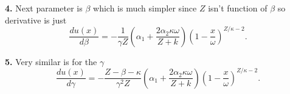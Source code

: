 \documentclass{article}
\begin{document}
\begin{appendices}

\bigskip

{\bf 4.} Next parameter is $\beta$ which is much simpler since $Z$ isn't function of $\beta$ so derivative is just
\begin{equation}\label{eq:db}
  \frac{d u(x)}{d\beta} =-\frac{1}{\gamma Z}\left(\alpha_1 + \frac{2\alpha_2 \kappa\omega}{Z+k}\right)\left(1-\frac{x}{\omega}\right)^{Z/\kappa-2}.
\end{equation}


\bigskip

{\bf 5.} Very similar is for the $\gamma$
\begin{equation}\label{eq:dg}
  \frac{d u(x)}{d\gamma} =-\frac{Z-\beta-\kappa}{\gamma^2 Z}\left(\alpha_1 + \frac{2\alpha_2 \kappa\omega}{Z+k}\right)\left(1-\frac{x}{\omega}\right)^{Z/\kappa-2}.
\end{equation}
\end{appendices}

\end{document}
